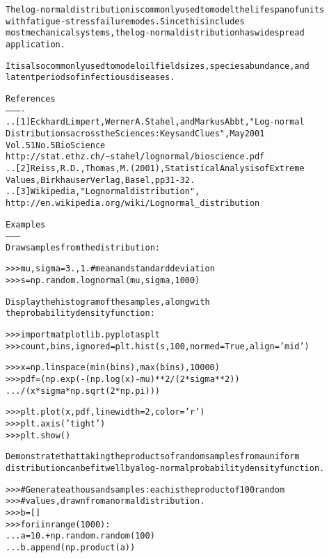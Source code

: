 \begin{boxedminipage}{\funcwidth}
\begin{alltt}
The log-normal distribution is commonly used to model the lifespan of units
with fatigue-stress failure modes. Since this includes
most mechanical systems, the log-normal distribution has widespread
application.

It is also commonly used to model oil field sizes, species abundance, and
latent periods of infectious diseases.

References
----------
.. [1] Eckhard Limpert, Werner A. Stahel, and Markus Abbt, "Log-normal
       Distributions across the Sciences: Keys and Clues", May 2001
       Vol. 51 No. 5 BioScience
       http://stat.ethz.ch/{\textasciitilde}stahel/lognormal/bioscience.pdf
.. [2] Reiss, R.D., Thomas, M.(2001), Statistical Analysis of Extreme
       Values, Birkhauser Verlag, Basel, pp 31-32.
.. [3] Wikipedia, "Lognormal distribution",
       http://en.wikipedia.org/wiki/Lognormal\_distribution

Examples
--------
Draw samples from the distribution:

{\textgreater}{\textgreater}{\textgreater} mu, sigma = 3., 1. \# mean and standard deviation
{\textgreater}{\textgreater}{\textgreater} s = np.random.lognormal(mu, sigma, 1000)

Display the histogram of the samples, along with
the probability density function:

{\textgreater}{\textgreater}{\textgreater} import matplotlib.pyplot as plt
{\textgreater}{\textgreater}{\textgreater} count, bins, ignored = plt.hist(s, 100, normed=True, align='mid')

{\textgreater}{\textgreater}{\textgreater} x = np.linspace(min(bins), max(bins), 10000)
{\textgreater}{\textgreater}{\textgreater} pdf = (np.exp(-(np.log(x) - mu)**2 / (2 * sigma**2))
...        / (x * sigma * np.sqrt(2 * np.pi)))

{\textgreater}{\textgreater}{\textgreater} plt.plot(x, pdf, linewidth=2, color='r')
{\textgreater}{\textgreater}{\textgreater} plt.axis('tight')
{\textgreater}{\textgreater}{\textgreater} plt.show()

Demonstrate that taking the products of random samples from a uniform
distribution can be fit well by a log-normal probability density function.

{\textgreater}{\textgreater}{\textgreater} \# Generate a thousand samples: each is the product of 100 random
{\textgreater}{\textgreater}{\textgreater} \# values, drawn from a normal distribution.
{\textgreater}{\textgreater}{\textgreater} b = []
{\textgreater}{\textgreater}{\textgreater} for i in range(1000):
...    a = 10. + np.random.random(100)
...    b.append(np.product(a))


\end{alltt}
\end{boxedminipage}
